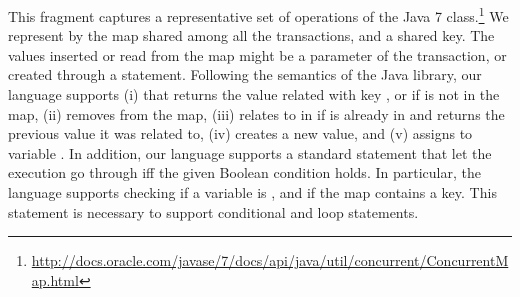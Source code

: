This fragment captures a representative set of operations of the Java 7  class.\footnote{\url{http://docs.oracle.com/javase/7/docs/api/java/util/concurrent/ConcurrentMap.html}} We represent by  the map shared among all the transactions, and  a shared key. The values inserted or read from the map might be a parameter of the transaction, or created through a  statement. Following the semantics of the Java library, our language supports (i)  that returns the value  related with key , or  if  is not in the map, (ii)  removes  from the map, (iii)  relates  to  in  if  is already in  and returns the previous value it was related to, (iv)  creates a new value, and (v)  assigns  to variable . In addition, our language supports a standard  statement that let the execution go through iff the given Boolean condition holds. In particular, the language supports checking if a variable is , and if the map contains a key. This statement is necessary to support conditional and loop statements.


%
%	
%
%
%


